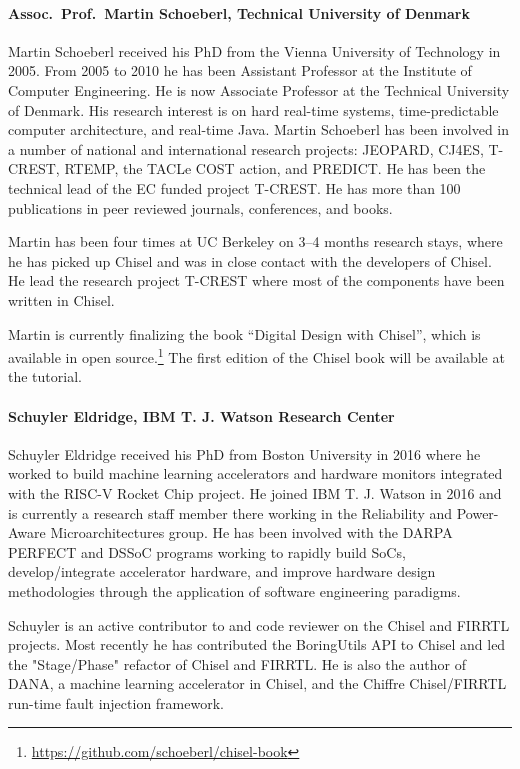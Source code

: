 \documentclass{article}
\begin{document}
 
\paragraph{Assoc.~Prof.~Martin Schoeberl, Technical University of Denmark}

Martin Schoeberl received his PhD from the Vienna University of Technology in 2005. From 2005 to 2010 he has been Assistant Professor at the Institute of Computer Engineering. He is now Associate Professor at the Technical University of Denmark. His research interest is on hard real-time systems, time-predictable computer architecture, and real-time Java.  Martin Schoeberl has been involved in a number of national and international research projects: JEOPARD, CJ4ES, T-CREST, RTEMP, the TACLe COST action, and PREDICT.  He has been the technical lead of the EC funded project T-CREST.  He has more than 100 publications in peer reviewed journals, conferences, and books.

Martin has been four times at UC Berkeley on 3--4 months research stays, where he has picked up Chisel
and was in close contact with the developers of Chisel.
He lead the research project T-CREST where most of the components have been
written in Chisel.

Martin is currently finalizing the book ``Digital Design with Chisel'',
which is available in open source.\footnote{\url{https://github.com/schoeberl/chisel-book}}
The first edition of the Chisel book will be available at the tutorial.

\paragraph{Schuyler Eldridge, IBM T. J. Watson Research Center} 

Schuyler Eldridge received his PhD from Boston University in 2016
where he worked to build machine learning accelerators and hardware
monitors integrated with the RISC-V Rocket Chip project. He joined IBM
T. J. Watson in 2016 and is currently a research staff member there
working in the Reliability and Power-Aware Microarchitectures group.
He has been involved with the DARPA PERFECT and DSSoC programs working
to rapidly build SoCs, develop/integrate accelerator hardware, and
improve hardware design methodologies through the application of
software engineering paradigms.

Schuyler is an active contributor to and code reviewer on the Chisel
and FIRRTL projects. Most recently he has contributed the BoringUtils
API to Chisel and led the "Stage/Phase" refactor of Chisel and FIRRTL.
He is also the author of DANA, a machine learning accelerator in
Chisel, and the Chiffre Chisel/FIRRTL run-time fault injection
framework.
\end{document}
